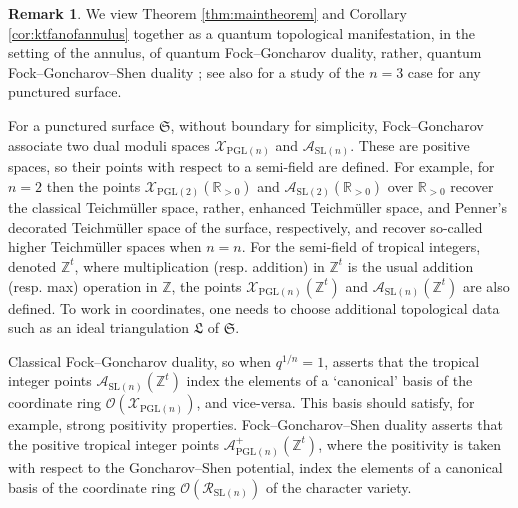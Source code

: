 \documentclass[12pt,
	]{amsart}
\theoremstyle{definition}
\newtheorem{remark}[theorem]{Remark}
\newcommand{\mrm}[1]{\mathrm{#1}}
\newcommand{\mbb}[1]{\mathbb{#1}}
\newcommand{\mcal}[1]{\mathcal{#1}}
\newcommand{\mfrak}[1]{\mathfrak{#1}}
\newcommand{\Z}{\mbb{Z}}
\newcommand{\R}{\mbb{R}}
\newcommand{\nsl}{\mrm{SL}(n)}
\newcommand{\twosl}{\mrm{SL}(2)}
\newcommand{\pngl}{\mrm{PGL}(n)}
\newcommand{\ptwogl}{\mrm{PGL}(2)}
\newcommand{\surf}{\mfrak{S}}
\newcommand{\qroot}{q^{1/n}}
\newcommand{\idealtriang}{\mfrak{L}}
\begin{document}
\begin{remark}
We view Theorem \ref{thm:maintheorem} and Corollary \ref{cor:ktfanofannulus} together as a quantum topological manifestation, in the setting of the annulus, of quantum Fock--Goncharov duality, rather, quantum Fock--Goncharov--Shen duality \cite{davisonMR4337972, fockMR2233852, fockMR2567745, goncharovMR3418241, goncharov2022quantum, grossMR3758151}; see also \cite{douglasMR4685684, douglas2022tropical, kim2022rm, shen2023intersections} for a study of the $n=3$ case for any punctured surface.  

For a punctured surface $\surf$, without boundary for simplicity, Fock--Goncharov associate two dual moduli spaces $\mcal{X}_{\pngl}$ and $\mcal{A}_{\nsl}$.  These are positive spaces, so their points with respect to a  semi-field are defined.  For example, for $n=2$ then the points $\mcal{X}_{\ptwogl}(\R_{>0})$ and $\mcal{A}_{\twosl}(\R_{>0})$ over $\R_{>0}$ recover the classical Teichm\"{u}ller space, rather, enhanced Teichm\"{u}ller space, and Penner's decorated Teichm\"{u}ller space of the surface, respectively, and recover so-called higher Teichm\"{u}ller spaces when $n=n$.  For the  semi-field of tropical integers, denoted $\Z^t$, where multiplication (resp. addition) in $\Z^t$ is the usual addition (resp. max) operation in $\Z$, the points $\mcal{X}_{\pngl}(\Z^t)$ and $\mcal{A}_{\nsl}(\Z^t)$ are also defined.  To work in coordinates, one needs to choose additional topological data such as an ideal triangulation $\idealtriang$ of $\surf$.

Classical Fock--Goncharov duality, so when $\qroot=1$, asserts that the tropical integer points $\mcal{A}_{\nsl}(\Z^t)$ index the elements of a `canonical' basis of the coordinate ring $\mcal{O}(\mcal{X}_{\pngl})$, and vice-versa.  This basis should satisfy, for example, strong positivity properties.  Fock--Goncharov--Shen duality asserts that the positive tropical integer points $\mcal{A}^+_{\pngl}(\Z^t)$, where the positivity is taken with respect to the Goncharov--Shen potential, index the elements of a canonical basis of the coordinate ring $\mcal{O}(\mcal{R}_{\nsl})$ of the character variety.   


\end{remark}
\end{document}

